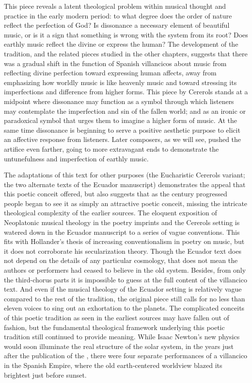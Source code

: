 This piece reveals a latent theological problem within musical thought and
practice in the early modern period: to what degree does the order of nature
reflect the perfection of God?
Is dissonance a necessary element of beautiful music, or is it a sign that
something is wrong with the system from its root?  
Does earthly music reflect the divine or express the human?
The development of the  tradition, and the related
pieces studied in the other chapters, suggests that there was a gradual shift in
the function of Spanish villancicos about music from reflecting divine
perfection toward expressing human affects, away from emphasizing how worldly
music is like heavenly music and toward stressing its imperfections and
difference from higher forms.
This piece by Cererols stands at a midpoint where dissonance may function as a
symbol through which listeners may contemplate the imperfection and sin of the
fallen world; and as an ironic or paradoxical symbol that urges them to imagine
a higher form of music. 
At the same time dissonance is beginning to serve a positive aesthetic purpose
to elicit an affective response from listeners.
Later composers, as we will see, pushed the artifice even farther, going to
more extravagant ends to demonstrate the untunefulness and imperfection of
earthly music.

The adaptations of this text for other purposes (the Eucharistic Cererols
variant; the two alternate texts of the Ecuador manuscript) demonstrates the
appeal that this poetic conceit offered, but also suggests that as the century
progressed people began to see it as simply an attractive poetic conceit,
missing the intricate theological complexity of the earlier sources.
The eloquent exposition of Neoplatonic musical theology in the poetry imprints
and the Cererols setting is watered down in the Ecuador manuscript to a series
of vague conventions.
This fits with Hollander's thesis of increasing conventionalism in poetry on
music, but it does not corroborate his secularization theory.
Though the Ecuador text does not depend on the details of any particular
cosmology, that does not mean the authors or performers had ceased to believe in
the old system.
Besides, from only the third-chorus parts it is impossible to guess at the full
content of the villancico text.  And even if the musical theology of the Ecuador
setting is relatively vague compared to the rest of the tradition, the original
piece still calls for no less than eleven voices to sing out an exhortation to
the planets.
The complicated conceits of this poetic tradition as seen in the earliest
sources may have fallen out of fashion, but the fundamental theological
framework underlying this poetic tradition still continued to provide meaning.
While Isaac Newton's new physics would soon illuminate the real structure of
the solar system, in the years just after the publication of the
, there were four separate performances of a
 villancico in the Spanish Empire, where the old
earth-centered worldview blazed its brightest just before sunset.

\endinput

